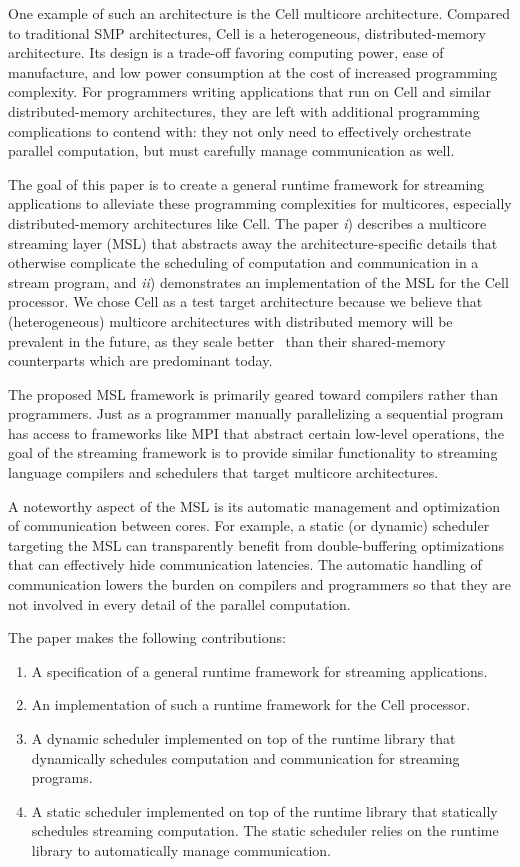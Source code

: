 One example of such an architecture is the Cell multicore
architecture. Compared to traditional SMP architectures, Cell is a
heterogeneous, distributed-memory architecture. Its design
is a trade-off favoring computing power, ease of manufacture, and
low power consumption at the cost of increased programming
complexity. For programmers writing applications that run on Cell and
similar distributed-memory architectures, they are left with
additional programming complications to contend with: they not only
need to effectively orchestrate parallel computation, but must
carefully manage communication as well.

The goal of this paper is to create a general runtime framework for
streaming applications to alleviate these programming complexities for
multicores, especially distributed-memory architectures like Cell. The
paper \emph{i}) describes a multicore streaming layer (MSL) that abstracts
away the architecture-specific details that otherwise complicate the
scheduling of computation and communication in a stream program, and
\emph{ii}) demonstrates an implementation of the MSL for the Cell
processor. We chose Cell as a test target architecture because we
believe that (heterogeneous) multicore architectures with distributed
memory will be prevalent in the future, as they scale
better~\cite{theo-phd-07} than their shared-memory counterparts which
are predominant today.

The proposed MSL framework is primarily geared toward compilers rather
than programmers. Just as a programmer manually parallelizing a
sequential program has access to frameworks like MPI that abstract
certain low-level operations, the goal of the streaming framework is
to provide similar functionality to streaming language compilers and
schedulers that target multicore architectures. 

A noteworthy aspect of the MSL is its automatic management and
optimization of communication between cores. For example, a static (or
dynamic) scheduler targeting the MSL can transparently benefit from
double-buffering optimizations that can effectively hide communication
latencies. The automatic handling of communication lowers the burden
on compilers and programmers so that they are not involved in every
detail of the parallel computation.

The paper makes the following contributions:
\begin{enumerate}
\item A specification of a general runtime framework for streaming applications.
\item An implementation of such a runtime framework for the Cell processor.
\item A dynamic scheduler implemented on top of the runtime library
  that dynamically schedules computation and communication for
  streaming programs.
\item A static scheduler implemented on top of the runtime library
  that statically schedules streaming computation. The static
  scheduler relies on the runtime library to automatically manage
  communication.
\end{enumerate}

